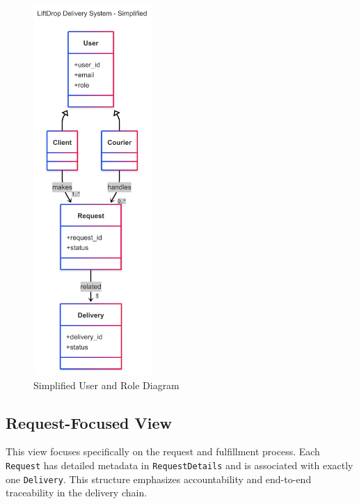 \begin{figure}[H]
    \centering
    \includegraphics[width=0.40\textwidth]{images/UserClientCourierDiagram.png}
    \caption{Simplified User and Role Diagram}
\end{figure}

\newpage

\subsection{Request-Focused View}

This view focuses specifically on the request and fulfillment process. Each \texttt{Request} has detailed metadata in \texttt{RequestDetails} and is associated with exactly one \texttt{Delivery}. This structure emphasizes accountability and end-to-end traceability in the delivery chain.

